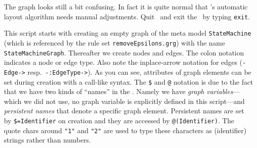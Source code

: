 The graph looks still a bit confusing.
In fact it is quite normal that \yComp's automatic layout algorithm needs manual adjustments.
Quit \yComp\ and exit the \GrShell\ by typing \texttt{exit}.

This script starts with creating an empty graph of the meta model \texttt{StateMachine} (which is referenced by the rule set \texttt{removeEpsilons.grg}) with the name \texttt{StateMachineGraph}.
Thereafter we create nodes and edges.
The colon notation indicates a node or edge type.
Also note the inplace-arrow notation for edges (\texttt{-Edge->} resp.\ \texttt{-:EdgeType->}).
As you can see, attributes of graph elements can be set during creation with a call-like syntax.
\makeatletter
The \texttt{\$} and \texttt{@} notation is due to the fact that we have two kinds of ``names'' in the \GrShell.
Namely we have \emph{graph variables}---which we did not use, no graph variable is explicitly defined in this script---and \emph{persistent names} that denote a specific graph element.
Persistent names are set by \texttt{\$=Identifier} on creation and they are accessed by \texttt{@(Identifier)}.
\makeatother
The quote chars around \texttt{"1"} and \texttt{"2"} are used to type these characters as (identifier) strings rather than numbers.

